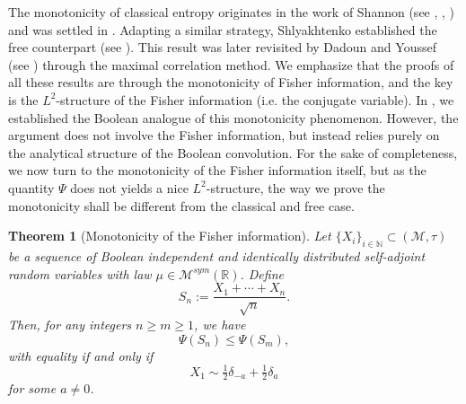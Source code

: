 \documentclass[10pt, reqno]{amsart}
\numberwithin{equation}{section}
\theoremstyle{definition}
\theoremstyle{plain}
\newtheorem{theorem}[definition]{Theorem}
\theoremstyle{remark}
\newcommand{\R}{\mathbb{R}}
\newcommand{\N}{\mathbb{N}}
\newcommand{\1}{\mathbbm{1}}
\newcommand{\probmsymr}{\mathcal{M}^{sym}(\R)}
\begin{document}
    The monotonicity of classical entropy originates in the work of Shannon (see \cite{shannon1948}, \cite{stam1959}, \cite{lieb1978}) and was settled in \cite{artstein2004}. Adapting a similar strategy, Shlyakhtenko established the free counterpart (see \cite{shlyakhtenko2007}). This result was later revisited by Dadoun and Youssef (see \cite{dadoun2021}) through the maximal correlation method. We emphasize that the proofs of all these results are through the monotonicity of Fisher information, and the key is the $L^2$-structure of the Fisher information (i.e. the conjugate variable). In \cite{pan2025entropy}, we established the Boolean analogue of this monotonicity phenomenon. However, the argument does not involve the Fisher information, but instead relies purely on the analytical structure of the Boolean convolution. For the sake of completeness, we now turn to the monotonicity of the Fisher information itself, but as the quantity $\Psi$ does not yields a nice $L^2$-structure, the way we prove the monotonicity shall be different from the classical and free case.
    \begin{theorem}[Monotonicity of the Fisher information]\label{thm:monofisher}
        Let $\{X_i\}_{i\in \N}\subset (\mathcal{M},\tau)$ be a sequence of Boolean independent and identically distributed self-adjoint random variables with law $\mu\in\probmsymr$.  Define
        \begin{equation*}
            S_n:=\frac{X_1+\cdots+X_n}{\sqrt{n}}.
        \end{equation*}
        Then, for any integers $n\ge m\ge 1$, we have
        \[
        \Psi(S_n)\le \Psi(S_m),
        \]
        with equality if and only if
        \[
        X_1\sim \tfrac{1}{2}\delta_{-a}+\tfrac{1}{2}\delta_a
        \]
        for some $a\neq 0$.
    \end{theorem}    
\end{document}
